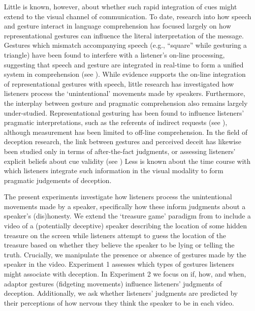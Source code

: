 \documentclass[a4paper,man,natbib]{apa6}
\begin{document}
Little is known, however, about whether such rapid integration of cues might extend to the visual channel of communication. 
To date, research into how speech and gesture interact in language comprehension has focused largely on how representational gestures can influence the literal interpretation of the message.
Gestures which mismatch accompanying speech (e.g., ``square'' while gesturing a triangle) have been found to interfere with a listener's on-line processing, suggesting that speech and gesture are integrated in real-time to form a unified system in comprehension (see \citealt{Kelly2010, Habets2013}).
While evidence supports the on-line integration of representational gestures with speech, little research has investigated how listeners process the `unintentional' movements made by speakers. 
Furthermore, the interplay between gesture and pragmatic comprehension also remains largely under-studied. 
Representational gesturing has been found to influence listeners' pragmatic interpretations, such as the referents of indirect requests (see \citealt{Kelly1999}), although measurement has been limited to off-line comprehension.
In the field of deception research, the link between gestures and perceived deceit has likewise been studied only in terms of after-the-fact judgments, or assessing listeners' explicit beliefs about cue validity (see \citealt{Vrij1996a, Zuckerman1981a}) 
Less is known about the time course with which listeners integrate such information in the visual modality to form pragmatic judgements of deception.


The present experiments investigate how listeners process the unintentional movements made by a speaker, specifically how these inform judgments about a speaker's (dis)honesty.
We extend the `treasure game' paradigm from \citet{Loy2017} to include a video of a (potentially deceptive) speaker describing the location of some hidden treasure on the screen while listeners attempt to guess the location of the treasure based on whether they believe the speaker to be lying or telling the truth.
Crucially, we manipulate the presence or absence of gestures made by the speaker in the video.
Experiment 1 assesses which types of gestures listeners might associate with deception.
In Experiment 2 we focus on if, how, and when, adaptor gestures (fidgeting movements) influence listeners' judgments of deception.
Additionally, we ask whether listeners' judgments are predicted by their perceptions of how nervous they think the speaker to be in each video.
\end{document}
